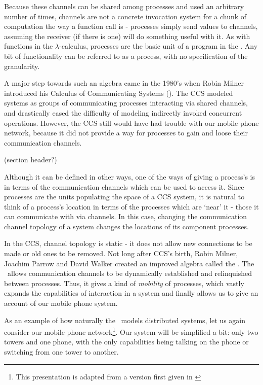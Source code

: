 Because these channels can be shared among processes and used an arbitrary number of times, channels are not a concrete invocation system for a chunk of computation the way a function call is - processes simply send values to channels, assuming the receiver (if there is one) will do something useful with it.  As with functions in the $\lambda$-calculus, processes are the basic unit of a program in the \picalc. Any bit of functionality can be referred to as a process, with no specification of the granularity.

A major step towards such an algebra came in the 1980's when Robin Milner introduced his Calculus of Communicating Systems (\!).   The CCS modeled systems as groups of communicating processes interacting via shared channels, and drastically eased the difficulty of modeling indirectly invoked concurrent operations.  However, the CCS still would have had trouble with our mobile phone network, because it did not provide a way for processes to gain and loose their communication channels.

(section header?)

	Although it can be defined in other ways, one of the ways of giving a process's\emph{} is in terms of the communication channels which can be used to access it.  Since processes are the units populating the space of a CCS system, it is natural to think of a process's location in terms of the processes which are `near' it - those it can communicate with via channels.  In this case, changing the communication channel topology of a system changes the locations of its component processes.  
	
	In the CCS, channel topology is static - it does not allow new connections to be made or old ones to be removed.  Not long after CCS's birth, Robin Milner, Joachim Parrow and David Walker created an improved algebra called the \inidx{\picalc}.  The \picalc\ allows communication channels to be dynamically established and relinquished between processes.  Thus, it gives a kind of \emph{mobility} of processes, which vastly expands the capabilities of interaction in a system and finally allows us to give an account of our mobile phone system.
	
	As an example of how naturally the \picalc\ models distributed systems, let us again consider our mobile phone network\footnote{This presentation is adapted from a version first given in \cite{miln99}}.  Our system will be simplified a bit: only two towers and one phone, with the only capabilities being talking on the phone or switching from one tower to another.
	
